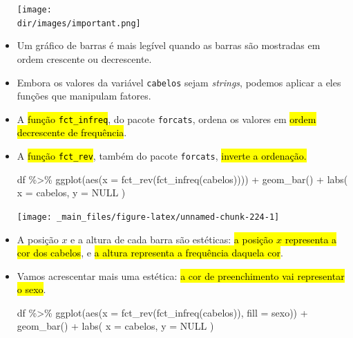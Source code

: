 \documentclass[
  11pt]{report}
\newenvironment{Shaded}{\begin{snugshade}}{\end{snugshade}}
\newcommand{\AttributeTok}[1]{\textcolor[rgb]{0.77,0.63,0.00}{#1}}
\newcommand{\ConstantTok}[1]{\textcolor[rgb]{0.00,0.00,0.00}{#1}}
\newcommand{\FunctionTok}[1]{\textcolor[rgb]{0.00,0.00,0.00}{#1}}
\newcommand{\NormalTok}[1]{#1}
\newcommand{\SpecialCharTok}[1]{\textcolor[rgb]{0.00,0.00,0.00}{#1}}
\newcommand{\StringTok}[1]{\textcolor[rgb]{0.31,0.60,0.02}{#1}}
\newcommand{\dir}{/ssd/R/x86_64-pc-linux-gnu-library/4.2/fnaufelRmd/rmarkdown/resources}
\newenvironment{rmdimportant}
{
  \begin{myimportant}
    \texttt{[image: \\dir/images/important.png]}
    \tcblower
  }
  {
  \end{myimportant}
}
\renewenvironment{Shaded}{
    \begin{mdframed}[%
      roundcorner=2pt,%
      innerleftmargin=5pt,%
      innerrightmargin=5pt,%
      topline=true,%
      leftline=true,%
      rightline=true,%
      bottomline=true,%
      linewidth=0.5pt,%
      linecolor=black!20,%
      backgroundcolor=black!2,%
      skipabove=2ex,%
      skipbelow=2.5ex%
    ]%
  }
  {
    \end{mdframed}
  }
\begin{document}
\begin{itemize}
\begin{rmdimportant}
  \end{rmdimportant}
\item
  Um gráfico de barras é mais legível quando as barras são mostradas em ordem crescente ou decrescente.
\item
  Embora os valores da variável \texttt{cabelos} sejam \emph{strings}, podemos aplicar a eles funções que manipulam fatores.
\item
  A {\hl{função {\mbox{\texttt{fct\_infreq}}}}}, do pacote \texttt{forcats}, ordena os valores em {\hl{ordem decrescente de frequência}}.
\item
  A {\hl{função {\mbox{\texttt{fct\_rev}}}}}, também do pacote \texttt{forcats}, {\hl{inverte a ordenação.}}

\begin{Shaded}
\begin{Highlighting}[]
\NormalTok{df }\SpecialCharTok{\%\textgreater{}\%} 
  \FunctionTok{ggplot}\NormalTok{(}\FunctionTok{aes}\NormalTok{(}\AttributeTok{x =} \FunctionTok{fct\_rev}\NormalTok{(}\FunctionTok{fct\_infreq}\NormalTok{(cabelos)))) }\SpecialCharTok{+}
    \FunctionTok{geom\_bar}\NormalTok{() }\SpecialCharTok{+}
    \FunctionTok{labs}\NormalTok{(}
      \AttributeTok{x =} \StringTok{\textquotesingle{}cabelos\textquotesingle{}}\NormalTok{,}
      \AttributeTok{y =} \ConstantTok{NULL}
\NormalTok{    )}
\end{Highlighting}
\end{Shaded}

  \begin{center}\texttt{[image: \_main\_files/figure-latex/unnamed-chunk-224-1]} \end{center}
\item
  A posição $x$ e a altura de cada barra são estéticas: {\hl{a posição $x$ representa a cor dos cabelos}}, e {\hl{a altura representa a frequência daquela cor}}.
\item
  Vamos acrescentar mais uma estética: {\hl{a cor de preenchimento vai representar o sexo}}.

\begin{Shaded}
\begin{Highlighting}[]
\NormalTok{df }\SpecialCharTok{\%\textgreater{}\%} 
  \FunctionTok{ggplot}\NormalTok{(}\FunctionTok{aes}\NormalTok{(}\AttributeTok{x =} \FunctionTok{fct\_rev}\NormalTok{(}\FunctionTok{fct\_infreq}\NormalTok{(cabelos)), }\AttributeTok{fill =}\NormalTok{ sexo)) }\SpecialCharTok{+}
    \FunctionTok{geom\_bar}\NormalTok{() }\SpecialCharTok{+}
    \FunctionTok{labs}\NormalTok{(}
      \AttributeTok{x =} \StringTok{\textquotesingle{}cabelos\textquotesingle{}}\NormalTok{,}
      \AttributeTok{y =} \ConstantTok{NULL}
\NormalTok{    )}
\end{Highlighting}
\end{Shaded}


\end{itemize}
\end{document}
